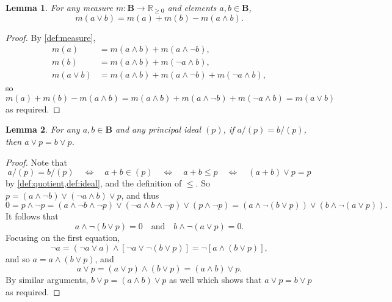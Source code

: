 \documentclass{article}
\newtheorem{lemma}{Lemma}
\theoremstyle{definition}
\theoremstyle{remark}
\begin{document}
\begin{lemma} \label{lemma:sum}
  For any measure $m\colon \mathbf{B} \to \mathbb{R}_{\ge 0}$ and elements $a, b
  \in \mathbf{B}$,
  \[
    m(a \lor b) = m(a) + m(b) - m(a \land b).
  \]
\end{lemma}
\begin{proof}
  By \cref{def:measure},
  \begin{align*}
    m(a) &= m(a \land b) + m(a \land \neg b), \\
    m(b) &= m(a \land b) + m(\neg a \land b), \\
    m(a \lor b) &= m(a \land b) + m(a \land \neg b) + m(\neg a \land b),
  \end{align*}
  so
  \[
    m(a) + m(b) - m(a \land b) = m(a \land b) + m(a \land \neg b) + m(\neg a
    \land b) = m(a \lor b)
  \]
  as required.
\end{proof}

\begin{lemma} \label{lemma:well-defined}
  For any $a, b \in \mathbf{B}$ and any principal ideal $(p)$, if $a/(p) =
  b/(p)$, then $a \lor p = b \lor p$.
\end{lemma}
\begin{proof}
  Note that
  \[
    a/(p) = b/(p) \quad \iff \quad a+b \in (p) \quad \iff \quad a+b \le p \quad
    \iff \quad (a+b) \lor p = p
  \]
  by \cref{def:quotient,def:ideal}, and the definition of $\le$. So $p = (a
  \land \neg b) \lor (\neg a \land b) \lor p$, and thus
  \[
    0 = p \land \neg p = (a \land \neg b \land \neg p) \lor (\neg a \land b
    \land \neg p) \lor (p \land \neg p) = (a \land \neg (b \lor p)) \lor (b
    \land \neg (a \lor p)).
  \]
  It follows that
  \[
    a \land \neg (b \lor p) = 0 \quad \text{and} \quad b \land \neg (a \lor p) =
    0.
  \]
  Focusing on the first equation,
  \[
    \neg a = (\neg a \lor a) \land [\neg a \lor \neg (b \lor p)] = \neg [a \land
    (b \lor p)],
  \]
  and so $a = a \land (b \lor p)$, and
  \[
    a \lor p = (a \lor p) \land (b \lor p) = (a \land b) \lor p.
  \]
  By similar arguments, $b \lor p = (a \land b) \lor p$ as well which shows that
  $a \lor p = b \lor p$ as required.
\end{proof}
\end{document}
